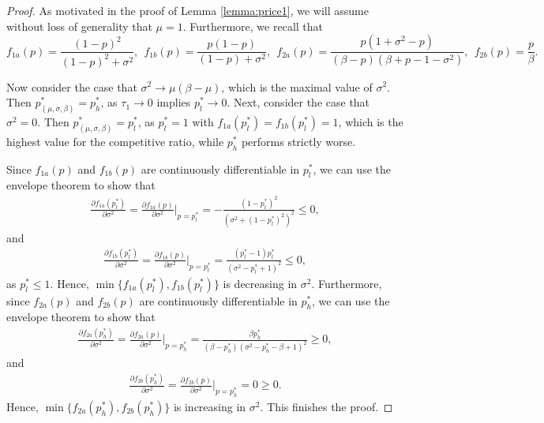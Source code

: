 \documentclass[10pt,a4paper]{amsart}
\begin{document}
\begin{proof}
    As motivated in the proof of Lemma \ref{lemma:price1}, we will assume without loss of generality that $\mu=1$. Furthermore, we recall that $$f_{1a}(p) = \frac{(1-p)^2}{(1-p)^2+\sigma^2},\ \ f_{1b}(p) = \frac{p(1-p)}{(1-p)+\sigma^2},\ \ f_{2a}(p) = \frac{p(1+\sigma^2-p)}{(\beta-p)(\beta+p-1-\sigma^2)}, \ \ f_{2b}(p) = \frac{p}{\beta}.$$

    Now consider the case that $\sigma^2 \xrightarrow{} \mu(\beta-\mu)$, which is the maximal value of $\sigma^2$. Then $p^*_{(\mu,\sigma,\beta)} = p^*_h$, as $\tau_1 \xrightarrow{} 0$ implies $p^*_l \xrightarrow{} 0$. Next, consider the case that $\sigma^2 = 0$. Then $p^*_{(\mu,\sigma,\beta)} = p^*_l$, as $p^*_l = 1$ with $f_{1a}(p^*_l) = f_{1b}(p^*_l) = 1$, which is the highest value for the competitive ratio, while $p^*_h$ performs strictly worse.
    
    Since $f_{1a}(p)$ and $f_{1b}(p)$ are continuously differentiable in $p^*_l$, we can use the envelope theorem to show that
    \begin{align}
        \frac{\partial f_{1a}(p^*_l)}{\partial \sigma^2} = \frac{\partial f_{1a}(p)}{\partial\sigma^2}\biggr\rvert_{p = p^*_l} = -\frac{\left(1 - p^*_l\right)^{2}}{\left(\sigma^2 + \left(1 - p^*_l\right)^{2}\right)^{2}} \leq 0,
    \end{align}
    and
    \begin{align}
        \frac{\partial f_{1b}(p^*_l)}{\partial \sigma^2} = \frac{\partial f_{1b}(p)}{\partial\sigma^2}\biggr\rvert_{p = p^*_l} = \frac{\left(p^*_l - 1\right) p^*_l}{\left(\sigma^2 - p^*_l + 1\right)^{2}} \leq 0,
    \end{align}
    as $p^*_l \leq 1$. Hence, $\min\{f_{1a}(p^*_l),f_{1b}(p^*_l)\}$ is decreasing in $\sigma^2$. Furthermore, since $f_{2a}(p)$ and $f_{2b}(p)$ are continuously differentiable in $p^*_h$, we can use the envelope theorem to show that
    \begin{align}
        \frac{\partial f_{2a}(p^*_h)}{\partial \sigma^2} = \frac{\partial f_{2a}(p)}{\partial\sigma^2}\biggr\rvert_{p = p^*_h} = \frac{\beta p^*_h}{(\beta-p^*_h)(\sigma^2-p^*_h-\beta+1)^2} \geq 0,
    \end{align}
    and
    \begin{align}
        \frac{\partial f_{2b}(p^*_h)}{\partial \sigma^2} = \frac{\partial f_{2b}(p)}{\partial\sigma^2}\biggr\rvert_{p = p^*_h} = 0 \geq 0.
    \end{align}
    Hence, $\min\{f_{2a}(p^*_h),f_{2b}(p^*_h)\}$ is increasing in $\sigma^2$. This finishes the proof.
\end{proof}
\end{document}
